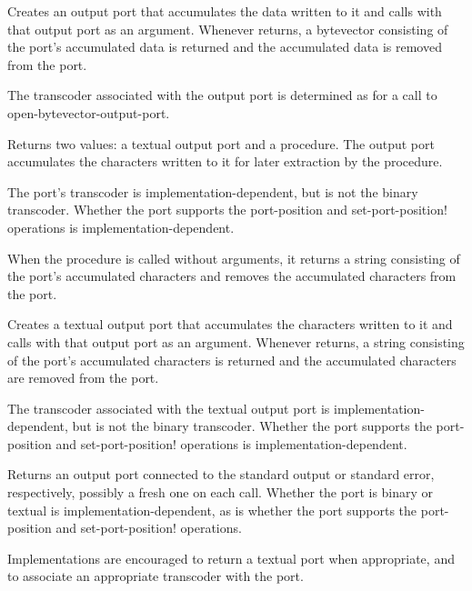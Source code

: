 \begin{entry}{%
}

Creates an output port that accumulates the data
written to it and calls  with that output port as an
argument. Whenever  returns, a bytevector consisting of the
port's accumulated data is returned and the accumulated data is
removed from the port.

The transcoder associated with the output port is determined
as for a call to {\cf open-bytevector-output-port}.
\end{entry}

\begin{entry}{%
}

Returns two values: a textual output port and a procedure.
The output port accumulates the characters written to it for
later extraction by the procedure.

The port's transcoder is implementation-dependent,
but is not the binary transcoder.
Whether the port supports
the {\cf port-position} and {\cf set-port-position!} operations
is implementation-dependent.

When the procedure is called without arguments, it returns a string consisting of the port's
accumulated characters and removes the accumulated characters from the port.
\end{entry}

\begin{entry}{%
}

Creates a textual output port that accumulates the
characters written to it and calls  with that output port
as an argument. Whenever  returns, a string consisting of the
port's accumulated characters is returned and the accumulated characters are
removed from the port.

The transcoder associated with the textual output port is
implementation-dependent, but is not the binary transcoder.
Whether the port supports
the {\cf port-position} and {\cf set-port-position!} operations
is implementation-dependent.
\end{entry}

\begin{entry}{%
}
   
Returns an output port connected to the standard output or standard error,
respectively, possibly a fresh one on each call.
Whether the port is binary or textual is implementation-dependent,
as is whether the port supports
the {\cf port-position} and {\cf set-port-position!} operations.

\begin{note}
  Implementations are encouraged to return a textual port when
  appropriate, and
  to associate an appropriate transcoder with the port.
\end{note}
\end{entry}

